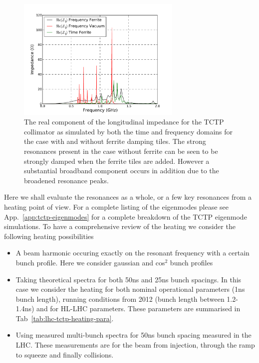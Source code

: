 \begin{figure}
\begin{center}
\includegraphics[width=0.7\textwidth]{LHC_Collimation_Upgrades/figures/longitudinal-impedance-tctp-ferr-freq-dom.pdf}
\end{center}
\label{fig:long-imp-tctp-freq}
\caption{The real component of the longitudinal impedance for the TCTP collimator as simulated by both the time and frequency domains for the case with and without ferrite damping tiles. The strong resonances present in the case without ferrite can be seen to be strongly damped when the ferrite tiles are added. However a substantial broadband component occurs in addition due to the broadened resonance peaks.}
\end{figure}

Here we shall evaluate the resonances as a whole, or a few key resonances from a heating point of view. For a complete listing of the eigenmodes please see App.~\ref{app:tctp-eigenmodes} for a complete breakdown of the TCTP eigenmode simulations. To have a comprehensive review of the heating we consider the following heating possibilities

\begin{itemize}
\item{A beam harmonic occuring exactly on the resonant frequency with a certain bunch profile. Here we consider gaussian and cos$^{2}$ bunch profiles}
\item{Taking theoretical spectra for both 50ns and 25ns bunch spacings. In this case we consider the heating for both nominal operational parameters (1ns bunch length), running conditions from 2012 (bunch length between 1.2-1.4ns) and for HL-LHC parameters. These parameters are summarised in Tab~\ref{tab:lhc-tctp-heating-para}.}
\item{Using measured multi-bunch spectra for 50ns bunch spacing measured in the LHC. These measurements are for the beam from injection, through the ramp to squeeze and finally collisions.}
\end{itemize}

